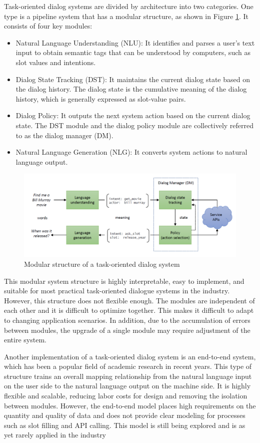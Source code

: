 \documentclass[10pt,twocolumn,letterpaper]{article}
\begin{document}
Task-oriented dialog systems are divided by architecture into two categories. One type is a pipeline system that has a modular structure, as shown in Figure \ref{pipelineframework}. It consists of four key modules:
\begin{itemize}
\item Natural Language Understanding (NLU): It identifies and parses a user’s text input to obtain semantic tags that can be understood by computers, such as slot values and intentions.
\item Dialog State Tracking (DST): It maintains the current dialog state based on the dialog history. The dialog state is the cumulative meaning of the dialog history, which is generally expressed as slot-value pairs.
\item Dialog Policy: It outputs the next system action based on the current dialog state. The DST module and the dialog policy module are collectively referred to as the dialog manager (DM).
\item Natural Language Generation (NLG): It converts system actions to natural language output.
\end{itemize}
\begin{figure}
    \centering
    \includegraphics[scale=0.6]{pipelineframework.png}
    \caption{Modular structure of a task-oriented dialog system}
    \label{pipelineframework}
\end{figure}
This modular system structure is highly interpretable, easy to implement, and suitable for most practical task-oriented dialogue systems in the industry. However, this structure does not flexible enough. The modules are independent of each other and it is difficult to optimize together. This makes it difficult to adapt to changing application scenarios. In addition, due to the accumulation of errors between modules, the upgrade of a single module may require adjustment of the entire system.

Another implementation of a task-oriented dialog system is an end-to-end system, which has been a popular field of academic research in recent years\cite{DBLP:conf/eacl/Rojas-BarahonaG17,madotto2018mem2seq,eric2017key,lei2018sequicity}.  This type of structure trains an overall mapping relationship from the natural language input on the user side to the natural language output on the machine side. It is highly flexible and scalable, reducing labor costs for design and removing the isolation between modules. However, the end-to-end model places high requirements on the quantity and quality of data and does not provide clear modeling for processes such as slot filling and API calling. This model is still being explored and is as yet rarely applied in the industry
\end{document}
